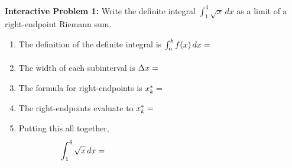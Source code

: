 \documentclass[12pt]{article}
\renewcommand{\lim}{\mathop{\mathrm{lim}}\limits}
\newcommand{\mathvidartifact}[1]{%
  \ifdefined\tagpdfmc
    \tagpdfmc{artifact}#1\tagpdfmcend
  \else
    #1%
  \fi
}
\newcommand{\prenotephantom}[1]{\mathvidartifact{\begingroup\color{white}#1\endgroup}}
\begin{document}
\textbf{Interactive Problem 1: } 
Write the definite integral $\int_1^4 \sqrt{x} \,dx$ as a limit of a right-endpoint Riemann sum. 

\begin{enumerate}[item-label={(\alph*)}]
    \item The definition of the definite integral is $\int_a^b f(x) \,dx = \prenotephantom{\lim_{n \to \infty} \sum_{k=1}^n f(x_k^*) \Delta x}$ \\[0.5cm]
    \item The width of each subinterval is $\Delta x = \prenotephantom{ \frac{b-a}{n} = \frac{4-1}{n} = \frac{3}{n}}$ \\[0.5cm]
    \item The formula for right-endpoints is $x_k^* = \prenotephantom{a + k \Delta x}$ \\[0.5cm]
    \item The right-endpoints evaluate to $x_k^* = \prenotephantom{1 + \frac{3k}{n}}$ \\[0.5cm]
    \item Putting this all together, 
    \[ \int_1^4 \sqrt{x} \,dx = \prenotephantom{\lim_{n \to \infty} \sum_{k=1}^n f(x_k^*) \Delta x = \lim_{n \to \infty} \sum_{k=1}^n \sqrt{1 + \frac{3k}{n}} \cdot \frac{3}{n}} \]
\end{enumerate}
\end{document}
